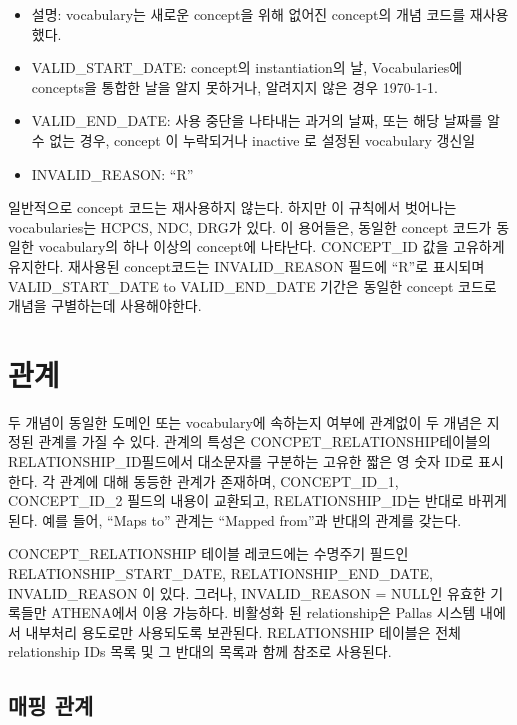 \documentclass[11pt]{book}
\providecommand{\tightlist}{%
  \setlength{\itemsep}{0pt}\setlength{\parskip}{0pt}}
\theoremstyle{definition}
\theoremstyle{definition}
\theoremstyle{definition}
\theoremstyle{remark}
\begin{document}
\begin{itemize}
  \begin{itemize}
  \tightlist
  \item
    설명: vocabulary는 새로운 concept을 위해 없어진 concept의 개념
    코드를 재사용했다.
  \item
    VALID\_START\_DATE: concept의 instantiation의 날, Vocabularies에
    concepts을 통합한 날을 알지 못하거나, 알려지지 않은 경우 1970-1-1.
  \item
    VALID\_END\_DATE: 사용 중단을 나타내는 과거의 날짜, 또는 해당 날짜를
    알수 없는 경우, concept 이 누락되거나 inactive 로 설정된 vocabulary
    갱신일
  \item
    INVALID\_REASON: ``R''
  \end{itemize}
\end{itemize}

일반적으로 concept 코드는 재사용하지 않는다. 하지만 이 규칙에서 벗어나는
vocabularies는 HCPCS, NDC, DRG가 있다. 이 용어들은, 동일한 concept
코드가 동일한 vocabulary의 하나 이상의 concept에 나타난다. CONCEPT\_ID
값을 고유하게 유지한다. 재사용된 concept코드는 INVALID\_REASON 필드에
``R''로 표시되며 VALID\_START\_DATE to VALID\_END\_DATE 기간은 동일한
concept 코드로 개념을 구별하는데 사용해야한다.

\section{관계}

두 개념이 동일한 도메인 또는 vocabulary에 속하는지 여부에 관계없이 두
개념은 지정된 관계를 가질 수 있다. 관계의 특성은
CONCPET\_RELATIONSHIP테이블의 RELATIONSHIP\_ID필드에서 대소문자를
구분하는 고유한 짧은 영 숫자 ID로 표시한다. 각 관계에 대해 동등한 관계가
존재하며, CONCEPT\_ID\_1, CONCEPT\_ID\_2 필드의 내용이 교환되고,
RELATIONSHIP\_ID는 반대로 바뀌게 된다. 예를 들어, ``Maps to'' 관계는
``Mapped from''과 반대의 관계를 갖는다. 

CONCEPT\_RELATIONSHIP 테이블 레코드에는 수명주기 필드인
RELATIONSHIP\_START\_DATE, RELATIONSHIP\_END\_DATE, INVALID\_REASON 이
있다. 그러나, INVALID\_REASON = NULL인 유효한 기록들만 ATHENA에서 이용
가능하다. 비활성화 된 relationship은 Pallas 시스템 내에서 내부처리
용도로만 사용되도록 보관된다. RELATIONSHIP 테이블은 전체 relationship
IDs 목록 및 그 반대의 목록과 함께 참조로 사용된다.

\subsection{매핑 관계}\label{conceptMapping}
\end{document}
